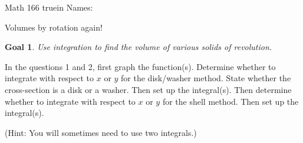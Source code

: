 \documentclass[12pt]{article}
\newtheorem*{goal}{Goal}
\begin{document}
\pagestyle{empty} %

\noindent
{Math 166  truein  Names:\ \hrulefill}

\noindent
{Volumes by rotation again!}

\medskip

\begin{goal} \rm
Use integration to find the volume of various \emph{solids of revolution}.
\end{goal}


In the questions 1 and 2, first graph the function(s). Determine whether to integrate with respect to $x$ or $y$ for the disk/washer method. State whether the cross-section is a disk or a washer. Then set up the integral(s). 
Then determine whether to integrate with respect to $x$ or $y$ for the shell method. Then set up the integral(s). 

(Hint: You will sometimes need to use two integrals.)
\end{document}
